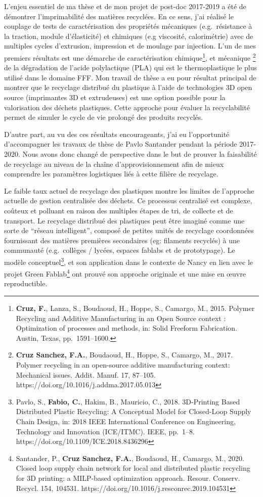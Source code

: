 \documentclass[
  11pt,
]{article}
\begin{document}
L'enjeu essentiel de ma thèse et de mon projet de post-doc 2017-2019 a
été de démontrer l'imprimabilité des matières recyclées. En ce sens,
j'ai réalisé le couplage de tests de caractérisation des propriétés
mécaniques (e.g.~résistance à la traction, module d'élasticité) et
chimiques (e.g viscosité, calorimétrie) avec de multiples cycles
d'extrusion, impression et de moulage par injection. L'un de mes
premiers résultats est une démarche de caractérisation
chimique\footnote{\textbf{Cruz, F.}, Lanza, S., Boudaoud, H., Hoppe, S.,
  Camargo, M., 2015. Polymer Recycling and Additive Manufacturing in an
  Open Source context : Optimization of processes and methods, in: Solid
  Freeform Fabrication. Austin, Texas, pp.~1591--1600.}, et mécanique
\footnote{\textbf{Cruz Sanchez, F.A.}, Boudaoud, H., Hoppe, S., Camargo,
  M., 2017. Polymer recycling in an open-source additive manufacturing
  context: Mechanical issues. Addit. Manuf. 17, 87--105.
  https://doi.org/10.1016/j.addma.2017.05.013} de la dégradation de
l'acide polylactique (PLA) qui est le thermoplastique le plus utilisé
dans le domaine FFF. Mon travail de thèse a eu pour résultat principal
de montrer que le recyclage distribué du plastique à l'aide de
technologies 3D open source (imprimantes 3D et extrudeuses) est une
option possible pour la valorisation des déchets plastiques. Cette
approche pour évaluer la recyclabilité permet de simuler le cycle de vie
prolongé des produits recyclés.

D'autre part, au vu des ces résultats encourageants, j'ai eu
l'opportunité d'accompagner les travaux de thèse de Pavlo Santander
pendant la période 2017-2020. Nous avons donc changé de perspective dans
le but de prouver la faisabilité de recyclage au niveau de la chaîne
d'approvisionnement afin de mieux comprendre les paramètres logistiques
liés à cette filière de recyclage.

Le faible taux actuel de recyclage des plastiques montre les limites de
l'approche actuelle de gestion centralisée des déchets. Ce processus
centralisé est complexe, coûteux et polluant en raison des multiples
étapes de tri, de collecte et de transport. Le recyclage distribué des
plastiques peut être imaginé comme une sorte de ``réseau intelligent'',
composé de petites unités de recyclage coordonnées fournissant des
matières premières secondaires (eg: filaments recyclés) à une communauté
(e.g.~collèges / lycées, espaces fablabs et de prototypage). Le modèle
conceptuel\footnote{Pavlo, S., \textbf{Fabio, C.}, Hakim, B., Mauricio,
  C., 2018. 3D-Printing Based Distributed Plastic Recycling: A
  Conceptual Model for Closed-Loop Supply Chain Design, in: 2018 IEEE
  International Conference on Engineering, Technology and Innovation
  (ICE/ITMC). IEEE, pp.~1--8. https://doi.org/10.1109/ICE.2018.8436296},
et son application dans le contexte de Nancy en lien avec le projet
Green Fablab\footnote{Santander, P., \textbf{Cruz Sanchez, F.A.},
  Boudaoud, H., Camargo, M., 2020. Closed loop supply chain network for
  local and distributed plastic recycling for 3D printing: a MILP-based
  optimization approach. Resour. Conserv. Recycl. 154, 104531.
  https://doi.org/10.1016/j.resconrec.2019.104531} ont prouvé son
approche originale et une mise en œuvre reproductible.
\end{document}

